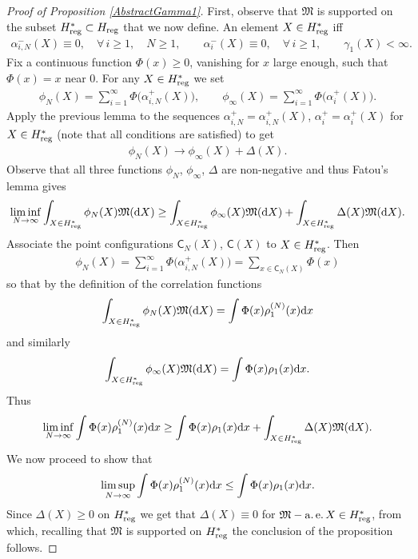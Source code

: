\documentclass[pdftex]{sigma}
\numberwithin{equation}{section}
\begin{document}
\begin{proof}[Proof of Proposition \ref{AbstractGamma1}]
First, observe that $\mathfrak{M}$ is supported on the subset $H^{*}_{{\rm reg}}\subset H_{{\rm reg}}$ that we now define. An element $X \in H^*_{{\rm reg}}$ iff
\begin{gather*}
\alpha_{i,N}^-(X)\equiv 0, \quad \forall\, i\ge 1, \quad N\ge 1, \qquad \alpha_i^-(X) \equiv 0, \quad \forall\, i \ge 1, \qquad \gamma_1(X)<\infty.
\end{gather*}
Fix a continuous function $\Phi(x)\ge 0$, vanishing for $x$ large enough, such that $\Phi(x)=x$ near 0. For any $X \in H^{*}_{{\rm reg}}$ we set
\begin{gather*}
\phi_N(X) =\sum_{i=1}^{\infty}\Phi\big(\alpha_{i,N}^+(X)\big),\qquad
\phi_{\infty}(X) =\sum_{i=1}^{\infty}\Phi\big(\alpha_i^+(X)\big).
\end{gather*}
Apply the previous lemma to the sequences $\alpha_{i,N}^+=\alpha_{i,N}^+(X)$, $\alpha_{i}^+=\alpha_{i}^+(X)$ for $X \in H^{*}_{{\rm reg}}$ (note that all conditions are satisfied) to get
\begin{gather*}
\phi_N(X)\to \phi_{\infty}(X)+\Delta(X).
\end{gather*}
Observe that all three functions $\phi_N$, $\phi_{\infty}$, $\Delta$ are non-negative and thus Fatou's lemma gives
\begin{gather*}
\liminf_{N\to \infty} \int_{X \in H^{*}_{{\rm reg}}}^{}\phi_N(X)\mathfrak{M}({\rm d}X) \ge \int_{X \in H^{*}_{{\rm reg}}}^{}\phi_\infty(X)\mathfrak{M}({\rm d}X)+\int_{X \in H^{*}_{{\rm reg}}}^{}\Delta(X)\mathfrak{M}({\rm d}X).
\end{gather*}
Associate the point configurations $\mathsf{C}_N(X)$, $\mathsf{C}(X)$ to $X\in H^{*}_{{\rm reg}}$. Then
\begin{gather*}
\phi_{N}(X)=\sum_{i=1}^{\infty} \Phi\big(\alpha_{i,N}^+(X)\big)=\sum_{x \in \mathsf{C}_N(X)}^{}\Phi(x)
\end{gather*}
so that by the definition of the correlation functions
\begin{gather*}
\int_{X \in H^{*}_{{\rm reg}}}^{}\phi_N(X)\mathfrak{M}({\rm d}X)=\int\Phi(x)\rho_1^{(N)}(x){\rm d}x
\end{gather*}
and similarly
\begin{gather*}
\int_{X \in H^{*}_{{\rm reg}}}^{}\phi_\infty(X)\mathfrak{M}({\rm d}X)= \int \Phi(x)\rho_1(x){\rm d}x.
\end{gather*}
Thus
\begin{gather*}
\liminf_{N \to \infty}\int\Phi(x)\rho_1^{(N)}(x){\rm d}x \ge \int \Phi(x)\rho_1(x){\rm d}x+\int_{X \in H^{*}_{{\rm reg}}}^{}\Delta(X)\mathfrak{M}({\rm d}X).
\end{gather*}
We now proceed to show that
\begin{gather*}
\limsup_{N \to \infty}\int\Phi(x)\rho_1^{(N)}(x){\rm d}x \le \int \Phi(x)\rho_1(x){\rm d}x.
\end{gather*}
Since $\Delta(X)\ge 0$ on $H^{*}_{{\rm reg}}$ we get that $\Delta(X)\equiv 0$ for $\mathfrak{M}-\operatorname{a.e.} X \in H^*_{{\rm reg}}$, from which, recalling that $\mathfrak{M}$ is supported on $H^*_{{\rm reg}}$ the conclusion of the proposition follows.


\end{proof}
\end{document}

